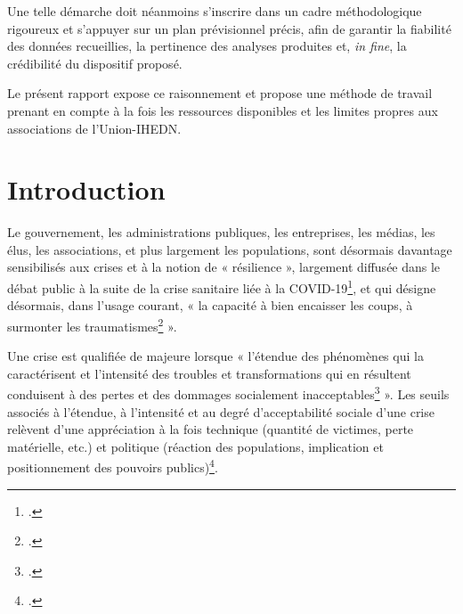 \documentclass[12pt,a4paper]{article}
\newcommand{\UnionIHEDN}{Union-IHEDN}
\newcommand{\AssociationsUnionIHEDN}{associations de l'\UnionIHEDN}
\begin{document}
Une telle démarche doit néanmoins s'inscrire dans un cadre méthodologique rigoureux et s'appuyer sur un plan prévisionnel précis, afin de garantir la fiabilité des données recueillies, la pertinence des analyses produites et, \textit{in fine}, la crédibilité du dispositif proposé.

Le présent rapport expose ce raisonnement et propose une méthode de travail prenant en compte à la fois les ressources disponibles et les limites propres aux \AssociationsUnionIHEDN.

\clearpage

\tableofcontents

\clearpage
{}

\listoffigures

\clearpage


\listoftables

\clearpage

\listofpropositions

\clearpage


\section{Introduction}

Le gouvernement, les administrations publiques, les entreprises, les médias, les élus, les associations, et plus largement les populations, sont désormais davantage sensibilisés aux crises et à la notion de « résilience », largement diffusée dans le débat public à la suite de la crise sanitaire liée à la COVID-19\footcite{Paries2020_resilience_covid19}, et qui désigne désormais, dans l'usage courant, « la capacité à bien encaisser les coups, à surmonter les traumatismes\footcite[1]{Paries2020_resilience_covid19} ».

Une crise est qualifiée de majeure lorsque « l'étendue des phénomènes qui la caractérisent et l'intensité des troubles et transformations qui en résultent conduisent à des pertes et des dommages socialement inacceptables\footcite{info_pompiers_crise_majeure_def} ». Les seuils associés à l'étendue, à l'intensité et au degré d'acceptabilité sociale d'une crise relèvent d'une appréciation à la fois technique (quantité de victimes, perte matérielle, etc.) et politique (réaction des populations, implication et positionnement des pouvoirs publics)\footcite{info_pompiers_crise_majeure_def}.
\end{document}
